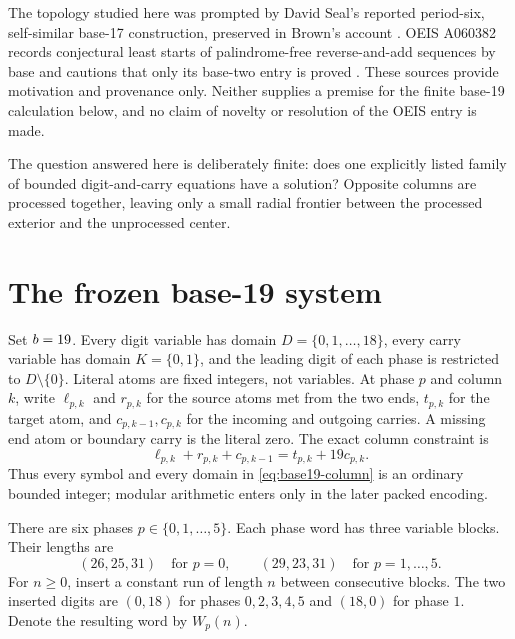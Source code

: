 \documentclass[11pt,twoside]{article}
\theoremstyle{remark}
\begin{document}
The topology studied here was prompted by David Seal's reported period-six,
self-similar base-17 construction, preserved in Brown's account
\cite{brownSeal}.  OEIS A060382 records conjectural least starts of
palindrome-free reverse-and-add sequences by base and cautions that only its
base-two entry is proved \cite{oeisA060382}.  These sources provide motivation
and provenance only.  Neither supplies a premise for the finite base-19
calculation below, and no claim of novelty or resolution of the OEIS entry is
made.

\begin{keyidea}
The question answered here is deliberately finite: does one explicitly
listed family of bounded digit-and-carry equations have a solution?  Opposite
columns are processed together, leaving only a small radial frontier between
the processed exterior and the unprocessed center.
\end{keyidea}

\section{The frozen base-19 system}
\label{sec:frozen-system}

Set $b=19$.  Every digit variable has domain
$D=\{0,1,\ldots,18\}$, every carry variable has domain $K=\{0,1\}$, and
the leading digit of each phase is restricted to $D\setminus\{0\}$.  Literal
atoms are fixed integers, not variables.  At phase $p$ and column $k$, write
$\ell_{p,k}$ and $r_{p,k}$ for the source atoms met from the two ends,
$t_{p,k}$ for the target atom, and $c_{p,k-1},c_{p,k}$ for the incoming and
outgoing carries.  A missing end atom or boundary carry is the literal zero.
The exact column constraint is
\begin{equation}
  \ell_{p,k}+r_{p,k}+c_{p,k-1}
  =t_{p,k}+19c_{p,k}.
  \label{eq:base19-column}
\end{equation}
Thus every symbol and every domain in \cref{eq:base19-column} is an ordinary
bounded integer; modular arithmetic enters only in the later packed encoding.

There are six phases $p\in\{0,1,\ldots,5\}$.  Each phase word has three
variable blocks.  Their lengths are
\[
  (26,25,31) \quad\text{for }p=0,
  \qquad
  (29,23,31) \quad\text{for }p=1,\ldots,5.
\]
For $n\geq 0$, insert a constant run of length $n$ between consecutive
blocks.  The two inserted digits are $(0,18)$ for phases $0,2,3,4,5$ and
$(18,0)$ for phase $1$.  Denote the resulting word by $W_p(n)$.
\end{document}

